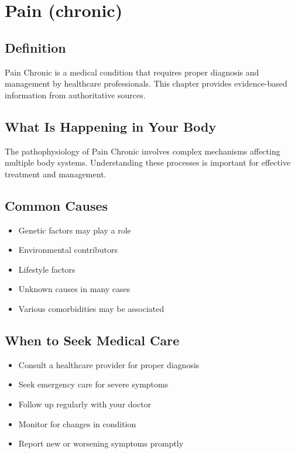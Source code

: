 
\chapter{Pain (chronic)}

\section*{Definition}
Pain Chronic is a medical condition that requires proper diagnosis and management by healthcare professionals. This chapter provides evidence-based information from authoritative sources.

\section*{What Is Happening in Your Body}
The pathophysiology of Pain Chronic involves complex mechanisms affecting multiple body systems. Understanding these processes is important for effective treatment and management.

\section*{Common Causes}
\begin{itemize}
  \item Genetic factors may play a role
  \item Environmental contributors
  \item Lifestyle factors
  \item Unknown causes in many cases
  \item Various comorbidities may be associated
\end{itemize}

\section*{When to Seek Medical Care}
\begin{itemize}
  \item Consult a healthcare provider for proper diagnosis
  \item Seek emergency care for severe symptoms
  \item Follow up regularly with your doctor
  \item Monitor for changes in condition
  \item Report new or worsening symptoms promptly
\end{itemize}

